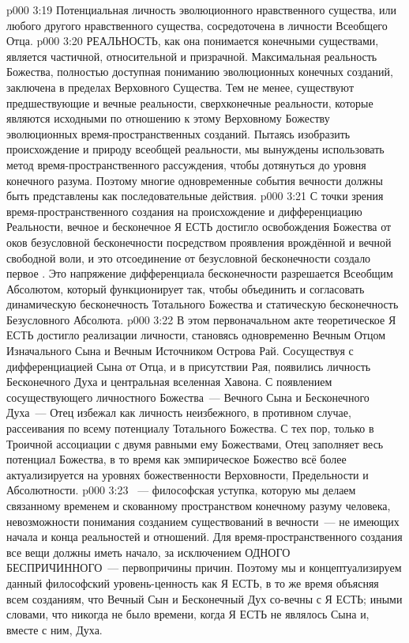 \vs p000 3:19 Потенциальная личность эволюционного нравственного существа, или любого другого нравственного существа, сосредоточена в личности Всеобщего Отца.
\vs p000 3:20 \pc РЕАЛЬНОСТЬ, как она понимается конечными существами, является частичной, относительной и призрачной. Максимальная реальность Божества, полностью доступная пониманию эволюционных конечных созданий, заключена в пределах Верховного Существа. Тем не менее, существуют предшествующие и вечные реальности, сверхконечные реальности, которые являются исходными по отношению к этому Верховному Божеству эволюционных время\hyp{}пространственных созданий. Пытаясь изобразить происхождение и природу всеобщей реальности, мы вынуждены использовать метод время\hyp{}пространственного рассуждения, чтобы дотянуться до уровня конечного разума. Поэтому многие одновременные события вечности должны быть представлены как последовательные действия.
\vs p000 3:21 С точки зрения время\hyp{}пространственного создания на происхождение и дифференциацию Реальности, вечное и бесконечное Я ЕСТЬ достигло освобождения Божества от оков безусловной бесконечности посредством проявления врождённой и вечной свободной воли, и это отсоединение от безусловной бесконечности создало первое . Это напряжение дифференциала бесконечности разрешается Всеобщим Абсолютом, который функционирует так, чтобы объединить и согласовать динамическую бесконечность Тотального Божества и статическую бесконечность Безусловного Абсолюта.
\vs p000 3:22 В этом первоначальном акте теоретическое Я ЕСТЬ достигло реализации личности, становясь одновременно Вечным Отцом Изначального Сына и Вечным Источником Острова Рай. Сосуществуя с дифференциацией Сына от Отца, и в присутствии Рая, появились личность Бесконечного Духа и центральная вселенная Хавона. С появлением сосуществующего личностного Божества~--- Вечного Сына и Бесконечного Духа~--- Отец избежал как личность неизбежного, в противном случае, рассеивания по всему потенциалу Тотального Божества. С тех пор, только в Троичной ассоциации с двумя равными ему Божествами, Отец заполняет весь потенциал Божества, в то время как эмпирическое Божество всё более актуализируется на уровнях божественности Верховности, Предельности и Абсолютности.
\vs p000 3:23 \pc {}~--- философская уступка, которую мы делаем связанному временем и скованному пространством конечному разуму человека, невозможности понимания созданием существований в вечности~--- не имеющих начала и конца реальностей и отношений. Для время\hyp{}пространственного создания все вещи должны иметь начало, за исключением ОДНОГО БЕСПРИЧИННОГО~--- первопричины причин. Поэтому мы и концептуализируем данный философский уровень\hyp{}ценность как Я ЕСТЬ, в то же время объясняя всем созданиям, что Вечный Сын и Бесконечный Дух со\hyp{}вечны с Я ЕСТЬ; иными словами, что никогда не было времени, когда Я ЕСТЬ не являлось  Сына и, вместе с ним, Духа.
